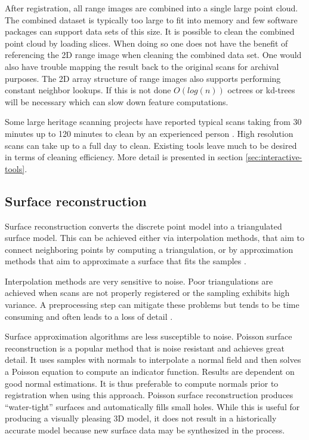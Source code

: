After registration, all range images are combined into a single large point cloud. The combined dataset is typically too large to fit into memory and few software packages can support data sets of this size. It is possible to clean the combined point cloud by loading slices. When doing so one does not have the benefit of referencing the 2D range image when cleaning the combined data set. One would also have trouble mapping the result back to the original scans for archival purposes. The 2D array structure of range images also supports performing constant neighbor lookups. If this is not done $O(log(n))$ octrees or kd-trees will be necessary which can slow down feature computations.

Some large heritage scanning projects have reported typical scans taking from 30 minutes up to 120 minutes to clean by an experienced person \cite{Ruther2011}. High resolution scans can take up to a full day to clean. Existing tools leave much to be desired in terms of cleaning efficiency. More detail is presented in section \ref{sec:interactive-tools}.

\subsection{Surface reconstruction}  \label{sec:reconstruction}


Surface reconstruction converts the discrete point model into a triangulated surface model. This can be achieved either via interpolation methods, that aim to connect neighboring points by computing a triangulation, or by approximation methods that aim to approximate a surface that fits the samples \cite{Schall2005}.

Interpolation methods are very sensitive to noise. Poor triangulations are achieved when scans are not properly registered or the sampling exhibits high variance. A preprocessing step can mitigate these problems but tends to be time consuming and often leads to a loss of detail \cite{Ruther2011}.

Surface approximation algorithms are less susceptible to noise. Poisson surface reconstruction \cite{Kazhdan2006} is a popular method that is noise resistant and achieves great detail. It uses samples with normals to interpolate a normal field and then solves a Poisson equation to compute an indicator function. Results are dependent on good normal estimations. It is thus preferable to compute normals prior to registration when using this approach. Poisson surface reconstruction produces ``water-tight'' surfaces and automatically fills small holes. While this is useful for producing a visually pleasing 3D model, it does not result in a historically accurate model because new surface data may be synthesized in the process.

